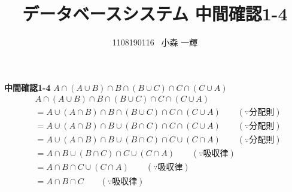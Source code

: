 \documentclass[dvipdfmx,10pt, a4j]{jarticle}
\title{データベースシステム 中間確認1-4}
\author{1108190116 \, 小森 一輝}
\theoremstyle{definition}
\begin{document}
    \maketitle

    \setcounter{section}{2}
    \noindent
    \textbf{中間確認1-4} $A \cap (A \cup B) \cap B \cap (B \cup C) \cap C \cap (C \cup A)$\\
    \begin{align*}
        &A \cap (A \cup B) \cap B \cap (B \cup C) \cap C \cap (C \cup A)\\
        &=A \cup (A \cap B) \cap B \cap (B \cup C) \cap C \cap (C \cup A) \qquad (\because 分配則)\\
        &=A \cup (A \cap B) \cap B \cup (B \cap C) \cap C \cap (C \cup A) \qquad (\because 分配則)\\
        &=A \cup (A \cap B) \cap B \cup (B \cap C) \cap C \cup (C \cap A) \qquad (\because 分配則)\\
        &=A \cap B \cup (B \cap C) \cap C \cup (C \cap A) \qquad (\because 吸収律)\\
        &=A \cap B \cap C \cup (C \cap A) \qquad (\because 吸収律)\\
        &=A \cap B \cap C \qquad (\because 吸収律)\\
    \end{align*}
    
\end{document}
